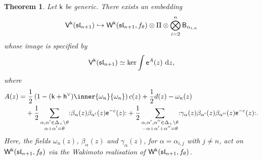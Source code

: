 \documentclass[10pt,a4paper]{amsart}
\numberwithin{equation}{section}
\renewcommand{\cong}{\simeq} %
\newcommand{\dd}{\mathrm{d}}   %
\newcommand{\ee}{\mathsf{e}}   %
\newcommand{\kk}{\mathsf{k}}   %
\DeclarePairedDelimiter{\brac}{\lparen}{\rparen}   %
\newcommand{\no}[1]{\mathopen{:} #1 \mathclose{:}} %
\newcommand{\alg}[1]{\mathfrak{#1}}  %
\newcommand{\VOA}[1]{\mathsf{#1}}    %
\newcommand{\SLA}[2]{\alg{#1}_{#2}}                      %
\newcommand{\slnpone}{\SLA{sl}{n+1}}
\newcommand{\cox}{\mathsf{h}}                                        %
\newcommand{\dcox}{\coroot{\cox}}                                    %
\newcommand{\proots}{\Delta_+}                                       %
\newcommand{\sroot}[1]{\alpha_{#1}}                                  %
\newcommand{\hroot}{\theta}                                          %
\newcommand{\fwt}[1]{\omega_{#1}}                                    %
\newcommand{\coroot}[1]{#1^{\vee}}                                   %
\newcommand{\fmin}{f_\theta}                                        %
\newcommand{\Wsymb}{\VOA{W}}
\newcommand{\uaffvoa}[2]{\VOA{V}^{#1}\brac{#2}}                   %
\newcommand{\bgvoa}{\VOA{B}}                                      %
\newcommand{\uQHR}[3]{\Wsymb^{#1}\brac{#2,#3}}                    %
\theoremstyle{plain}
\newtheorem{theorem}{Theorem}[section]
\begin{document}
\begin{theorem} \label{thm:mintoaff}
Let $\kk$ be generic. There exists an embedding 
%
\begin{equation}
    \uaffvoa{\kk}{\slnpone} \hookrightarrow \uQHR{\kk}{\slnpone}{\fmin} \otimes \Pi \otimes \bigotimes_{i=2}^{n} \bgvoa_{\sroot{i,n}}
\end{equation}
%
whose image is specified by
%
\begin{equation}
    \uaffvoa{\kk}{\slnpone} \cong \textup{\normalfont ker} \int  \ee^{A}(z) \ \dd z,
\end{equation}
%
where
%
\begin{align} \label{eq:finalscreening}
     A(z) = &\ \frac{1}{2}\left(1-(\kk+\dcox)\inner{\fwt{n}}{\fwt{n}} \right) c(z) + \frac{1}{2}d(z)  - \omega_n(z) \\
    &+ \frac{1}{2} \sum_{\substack{\alpha,\alpha' \in \proots \setminus \hroot \\ \alpha+\alpha'=\hroot}} \no{\beta_\alpha (z) \beta_{\alpha'}(z)\ee^{-c}(z)} 
    +\frac{1}{2} \sum_{\substack{\alpha,\alpha',\alpha'' \in \proots \setminus \hroot \\ -\alpha+\alpha'+\alpha''=\hroot}} \no{\gamma_\alpha(z) \beta_{\alpha'} (z) \beta_{\alpha''}(z)\ee^{-c}(z)}. \notag
\end{align}
%
Here, the fields $\omega_n(z)$, $\beta_\alpha(z)$ and $\gamma_\alpha(z)$, for $\alpha =\sroot{i,j}$ with $ j \neq n$, act on $\uQHR{\kk}{\slnpone}{\fmin}$ via the Wakimoto realisation of $\uQHR{\kk}{\slnpone}{\fmin}$.
\end{theorem}
\end{document}
